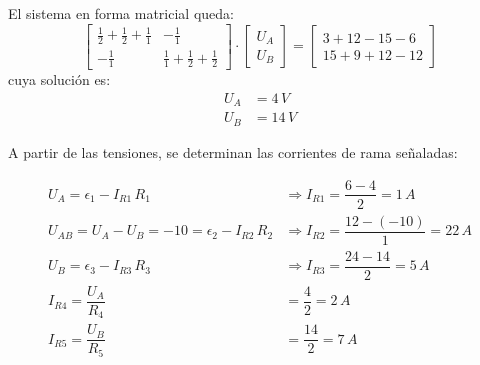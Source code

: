 \begin{example}
El sistema en forma matricial queda:
\begin{equation*}
    \begin{bmatrix}
        \frac{1}{2}+\frac{1}{2}+\frac{1}{1} & -\frac{1}{1}\\
        -\frac{1}{1} & \frac{1}{1}+\frac{1}{2}+\frac{1}{2}
    \end{bmatrix}
    \cdot
    \begin{bmatrix}
        U_A\\
        U_B
    \end{bmatrix}
    =
    \begin{bmatrix}
        3+12-15-6\\
        15+9+12-12
    \end{bmatrix}
\end{equation*}
cuya solución es: 
\begin{align*}
    U_A&=4\,V\\
    U_B&=14\,V
\end{align*}

A partir de las tensiones, se determinan las corrientes de rama señaladas:


\begin{align*}
  U_A=\epsilon_1-I_{R1}\,R_1&\Rightarrow {I_{R1}=\dfrac{6-4}{2}=1\,A}\\
  U_{AB}=U_A-U_B=-10=\epsilon_2 - I_{R2}\, R_2&\Rightarrow I_{R2} = \dfrac{12-(-10)}{1}=22\,A\\
  U_B=\epsilon_3-I_{R3}\,R_3 &\Rightarrow I_{R3}=\dfrac{24-14}{2}=5\,A\\
  I_{R4}=\dfrac{U_A}{R_4}&=\dfrac{4}{2}=2\,A\\
  I_{R5}=\dfrac{U_B}{R_5}&=\dfrac{14}{2}=7\,A
\end{align*}


\end{example}
